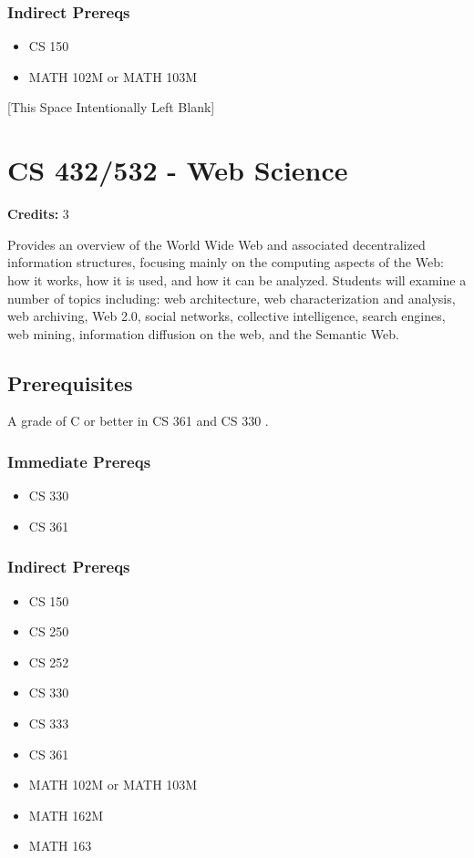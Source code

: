 \documentclass[]{article}
\providecommand{\tightlist}{%
  \setlength{\itemsep}{0pt}\setlength{\parskip}{0pt}}
\newcommand{\pagebreakhere}{
\vspace*{\fill}
\begin{center}
[This Space Intentionally Left Blank]
\end{center}
\vspace*{\fill}
\newpage
}
\begin{document}
\subsubsection{Indirect Prereqs}\label{indirect-prereqs-22}

\begin{itemize}
\tightlist
\item
  CS 150
\item
  MATH 102M or MATH 103M
\end{itemize}

\pagebreakhere
\section{CS 432/532 - Web Science}\label{cs-432532---web-science}

\textbf{Credits:} 3

Provides an overview of the World Wide Web and associated decentralized
information structures, focusing mainly on the computing aspects of the
Web: how it works, how it is used, and how it can be analyzed. Students
will examine a number of topics including: web architecture, web
characterization and analysis, web archiving, Web 2.0, social networks,
collective intelligence, search engines, web mining, information
diffusion on the web, and the Semantic Web.

\subsection{Prerequisites}\label{prerequisites-31}

A grade of C or better in CS 361 and CS 330 .

\subsubsection{Immediate Prereqs}\label{immediate-prereqs-23}

\begin{itemize}
\tightlist
\item
  CS 330
\item
  CS 361
\end{itemize}

\subsubsection{Indirect Prereqs}\label{indirect-prereqs-23}

\begin{itemize}
\tightlist
\item
  CS 150
\item
  CS 250
\item
  CS 252
\item
  CS 330
\item
  CS 333
\item
  CS 361
\item
  MATH 102M or MATH 103M
\item
  MATH 162M
\item
  MATH 163
\end{itemize}
\end{document}
